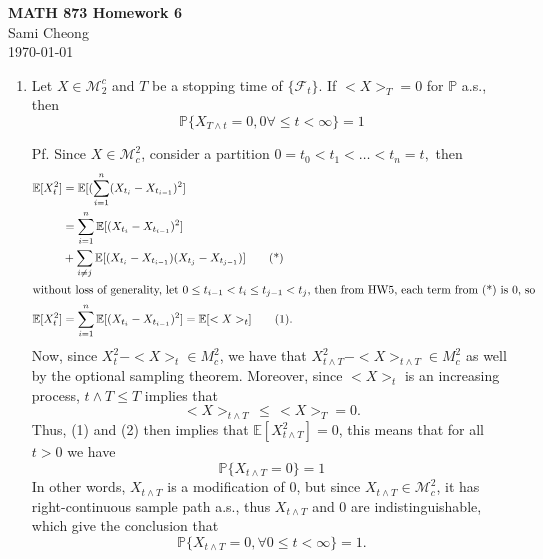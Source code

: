 \documentclass[11pt]{article}
\newcommand{\F}{{\mathcal F}}
\newcommand{\pr}{{\mathbb P}}
\newcommand{\ex}{{\mathbb E}}
\begin{document}
 
\begin{center}
{\bf \large MATH 873 Homework 6}
\\
Sami Cheong
\\
\today
\end{center}
\begin{enumerate}
\item Let $X \in \mathcal{M}^c_2$ and $T$ be a stopping time of $\{\F_t\}$. If $<X>_T = 0$ for $\pr$ a.s., then
\[
\pr\{ X_{T \wedge t} = 0, 0 \forall \leq t < \infty \} = 1
\]
\item[Pf.] Since $X \in \mathcal{M}_c^2$, consider a partition $0 = t_0 < t_1 < \dots < t_n = t,$ then 
\begin{align*}
\ex[X^2_t] &= \ex[(\sum_{i=1}^{n}(X_{t_i}-X_{t_{i-1}})^2]\\
&=\sum_{i=1}^n \ex[(X_{t_i}-X_{t_{i-1}})^2] \\
& + \sum_{i\not=j} \ex[(X_{t_i}-X_{t_{i-1}})(X_{t_j}-X_{t_{j-1}})] \tag{*}\\
\intertext{without loss of generality, let $0 \leq t_{i-1} < t_{i} \leq t_{j-1} < t_{j}$, then from HW5, each term from (*) is 0, so}
\ex[X^2_t] &=\sum_{i=1}^{n} \ex[(X_{t_i}-X_{t_{i-1}})^2]  = \ex[<X>_t] \tag{1}.
\end{align*}
Now, since $X^2_{t}- <X>_t  \in M_{c}^2$, we have that $X^2_{t\wedge T}- <X>_{t\wedge T} \in M_{c}^2$ as well by the optional sampling theorem. Moreover, since $<X>_t$ is an increasing process, $t\wedge T \leq T$ implies that 
\[
<X>_{t\wedge T} \hspace{2pt} \leq  \hspace{2pt}<X>_T = 0. \tag{2}
\] 
Thus, (1) and (2) then implies that $\ex[X^2_{t\wedge T}] = 0$, this means that for all $t>0$ we have 
\[
\pr \{ X_{t \wedge T} = 0 \} = 1
\]
In other words, $X_{t\wedge T}$ is a modification of 0, but since $X_{t\wedge T} \in \mathcal{M}_c^2$, it has right-continuous sample path a.s., thus $X_{t\wedge T}$ and 0 are indistinguishable, which give the conclusion that
\[
\pr \{X_{t \wedge T} = 0, \forall 0 \leq t < \infty\} =1.
\]
\end{enumerate}
\end{document}
